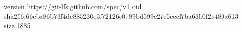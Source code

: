 version https://git-lfs.github.com/spec/v1
oid sha256:66cba86b73f4de885230e3f72126c0789bd599c27c5cccf7ba63b0f2c489a613
size 1885
